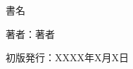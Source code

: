 \documentclass[index]{subfiles}
\begin{document}
  \thispagestyle{empty}
  \begin{flushright}
    \begin{minipage}{0.7\hsize}
      \begin{description}
        \item{書名}
        \item{著者：}著者
        \item{初版発行：}XXXX年X月X日
      \end{description}
    \end{minipage}
  \end{flushright}
\end{document}
